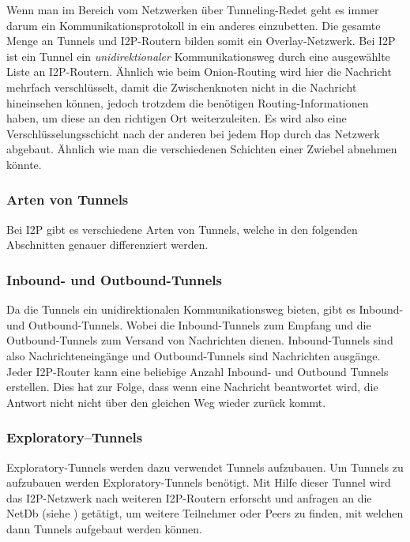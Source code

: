 Wenn man im Bereich vom Netzwerken über Tunneling-Redet geht es immer darum ein Kommunikationsprotokoll in ein anderes einzubetten. \parencite{noauthor_duden_nodate}
Die gesamte Menge an Tunnels und I2P-Routern bilden somit ein Overlay-Netzwerk.
Bei I2P ist ein Tunnel ein \textit{unidirektionaler} Kommunikationsweg durch eine ausgewählte Liste an I2P-Routern.
Ähnlich wie beim Onion-Routing wird hier die Nachricht mehrfach verschlüsselt, damit die Zwischenknoten nicht in die Nachricht hineinsehen können, jedoch trotzdem die benötigen Routing-Informationen haben, um diese an den richtigen Ort weiterzuleiten.
Es wird also eine Verschlüsselungsschicht nach der anderen bei jedem Hop durch das Netzwerk abgebaut.
Ähnlich wie man die verschiedenen Schichten einer Zwiebel abnehmen könnte.
\parencites{noauthor_intro_nodate}[S.~2]{liu_empirical_2014}

\subsubsection{Arten von Tunnels}

Bei I2P gibt es verschiedene Arten von Tunnels, welche in den folgenden Abschnitten genauer differenziert werden.

\subsubsection{Inbound- und Outbound-Tunnels}
Da die Tunnels ein unidirektionalen Kommunikationsweg bieten, gibt es Inbound- und Outbound-Tunnels.
Wobei die Inbound-Tunnels zum Empfang und die Outbound-Tunnels zum Versand von Nachrichten dienen.
Inbound-Tunnels sind also Nachrichteneingänge und Outbound-Tunnels sind Nachrichten ausgänge.
Jeder I2P-Router kann eine beliebige Anzahl Inbound- und Outbound Tunnels erstellen.
Dies hat zur Folge, dass wenn eine Nachricht beantwortet wird, die Antwort nicht nicht über den gleichen Weg wieder zurück kommt.
\cite{noauthor_intro_nodate}

\subsubsection{Exploratory--Tunnels}

Exploratory-Tunnels werden dazu verwendet Tunnels aufzubauen.
Um Tunnels zu aufzubauen werden Exploratory-Tunnels benötigt.
Mit Hilfe dieser Tunnel wird das I2P-Netzwerk nach weiteren I2P-Routern erforscht und anfragen an die NetDb (siehe ) getätigt,
um weitere Teilnehmer oder Peers zu finden, mit welchen dann Tunnels aufgebaut werden können.
\cite{de_boer_invisible_2019}

